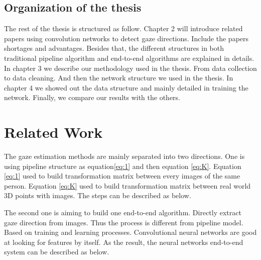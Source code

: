 \documentclass[senior]{IPSstyle}
\begin{document}


\section{Organization of the thesis}
The rest of the thesis is structured as follow.
Chapter 2 will introduce related papers using convolution networks to detect gaze directions.
Include the papers shortages and advantages.
Besides that, the different structures in both traditional pipeline algorithm and end-to-end algorithms are explained in details.
In chapter 3 we describe our methodology used in the thesis.
From data collection to data cleaning.
And then the network structure we used in the thesis.
In chapter 4 we showed out the data structure and mainly detailed in training the network.
Finally, we compare our results with the others.

\chapter{Related Work} \label{related_work}
The gaze estimation methods are mainly separated into two directions.
One is using pipeline structure as equation\ref{eq:1} and then equation \ref{eq:K}.
Equation \ref{eq:1} used to build transformation matrix between every images of the same person.
Equation \ref{eq:K} used to build transformation matrix between real world 3D points with images.
The steps can be described as below.
\begin{center}
\end{center}

The second one is aiming to build one end-to-end algorithm.
Directly extract gaze direction from images.
Thus the process is different from pipeline model.
Based on training and learning processes.
Convolutional neural networks are good at looking for features by itself.
As the result, the neural networks end-to-end system can be described as below.
\begin{center}
\end{center}
\end{document}
